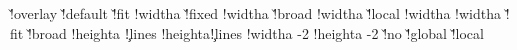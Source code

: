 {     \boxhasoffsetfalse
     \boxhasstrutfalse
     \boxisoverlaidfalse
     \@@localoffset{}
   \else\ifx\localoffset\v!overlay
     \boxhasoffsetfalse
     \boxhasstrutfalse
     \boxisoverlaidtrue
     \@@localoffset\zeropoint
   \else
     \boxhasoffsettrue
     \boxhasstruttrue
     \boxisoverlaidfalse
     \ifx\localoffset\v!default %
       \let\localoffset\defaultframeoffset
     \else
       \let{}\localoffset
     \fi
     \@@localoffset\localoffset
     \advance\@@localoffset {}
   \fi\fi
   \ifx\localwidth\v!fit
     \ifboxhasformat
       \boxhaswidthtrue
       \!!widtha\hsize
     \else
       \boxhaswidthfalse
     \fi
   \else\ifx\localwidth\v!fixed %
     \ifboxhasformat
       \boxhaswidthtrue
       \!!widtha\hsize
     \else
       \boxhaswidthfalse
     \fi
   \else\ifx\localwidth\v!broad
     \boxhaswidthtrue
     \!!widtha\hsize
   \else\ifx\localwidth\v!local
     \boxhaswidthtrue
     \setlocalhsize
     \!!widtha\localhsize
   \else
     \boxhaswidthtrue
     \!!widtha\localwidth
   \fi\fi\fi\fi
   \ifx\localheight\v!fit
     \boxhasheightfalse %
   \else\ifx\localheight\v!broad
     \boxhasheightfalse
   \else
     \boxhasheighttrue
     \!!heighta\localheight
   \fi\fi
   \ifboxhasheight
   \else
       {\ifcase\framedparameter\c!lines\else
          \!!heighta\framedparameter\c!lines\lineheight
          \edef\localheight{\the\!!heighta}%
          \boxhasheighttrue
        \fi}%
   \fi
   \advance\!!widtha  -2\@@localoffset
   \advance\!!heighta -2\@@localoffset
   \ifx\localstrut\v!no
     \boxhasstrutfalse
   \else\ifx\localstrut\v!global
     \setstrut
   \else\ifx\localstrut\v!local
     \setfontstrut
   \fi\fi\fi
   \ifboxhasstrut
     \setstrut
     \let\localbegstrut\begstrut
     \let\localendstrut\endstrut
     \let\localstrut   \strut
   \else
     \let\localbegstrut\pseudobegstrut %
     \let\localendstrut\pseudoendstrut %
     \let\localstrut   \pseudostrut    %
}
